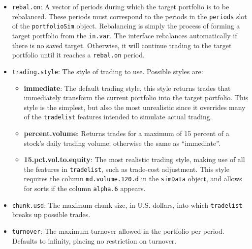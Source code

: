 \documentclass{article}
\begin{document}
\begin{itemize}
\item{\texttt{rebal.on}}: A vector of periods during which the target
portfolio is to be rebalanced.  These periods must correspond to the
periods in the \texttt{periods} slot of the \texttt{portfolioSim}
object.  Rebalancing is simply the process of forming a target
portfolio from the \texttt{in.var}.  The interface rebalances
automatically if there is no saved target.  Otherwise, it will
continue trading to the target portfolio until it reaches a
\texttt{rebal.on} period.

\item{\texttt{trading.style}}: The style of trading to use. Possible
styles are:

\begin{itemize}

\item{\bf{immediate}}: The default trading style, this style returns
trades that immediately transform the current portfolio into the
target portfolio.  This style is the simplest, but also the most
unrealistic since it overrides many of the \texttt{tradelist} features
intended to simulate actual trading.

\item{\bf{percent.volume}}: Returns trades for a maximum of 15 percent
of a stock's daily trading volume; otherwise the same as ``immediate''.

\item{\bf{15.pct.vol.to.equity}}: The most realistic trading style,
making use of all the features in \texttt{tradelist}, such as
trade-cost adjustment.  This style requires the column
\texttt{md.volume.120.d} in the \texttt{simData} object, and allows
for sorts if the column \texttt{alpha.6} appears.

\end{itemize}

\item{\texttt{chunk.usd}}: The maximum chunk size, in U.S. dollars,
into which \texttt{tradelist} breaks up possible trades.

\item{\texttt{turnover}}: The maximum turnover allowed in the
portfolio per period.  Defaults to infinity, placing no restriction on
turnover.

\end{itemize}
\end{document}

